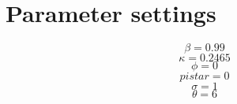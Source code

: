 \section{Parameter settings}

\begin{equation}
\beta = 0.99
\end{equation}
\begin{equation}
\kappa = 0.2465
\end{equation}
\begin{equation}
\phi = 0
\end{equation}
\begin{equation}
{p\!i\!s\!t\!a\!r} = 0
\end{equation}
\begin{equation}
\sigma = 1
\end{equation}
\begin{equation}
\theta = 6
\end{equation}


